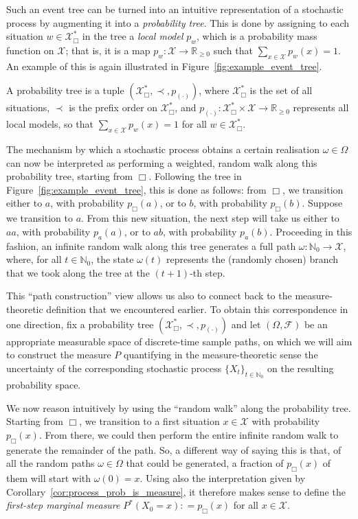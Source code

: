 \documentclass[graybox]{svmult}
\newcommand{\nats}{\mathbb{N}}
\newcommand{\natswith}{\nats_{0}}
\newcommand{\reals}{\mathbb{R}}
\newcommand{\realsnonneg}{\reals_{\geq 0}}
\newcommand{\states}{\mathcal{X}}
\newcommand{\coloneqq}{:\!=}
\begin{document}
Such an event tree can be turned into an intuitive representation of a stochastic process by augmenting it into a \emph{probability tree}. This is done by assigning to each situation $w\in\states^*_\Box$ in the tree a \emph{local model} $p_{w}$, which is a probability mass function on $\states$; that is, it is a map $p_w:\states\to\realsnonneg$ such that $\sum_{x\in\states}p_w(x)=1$. An example of this is again illustrated in Figure~\ref{fig:example_event_tree}.
\begin{definition}\label{def:prob_tree}
A probability tree is a tuple $(\states^*_\Box,\prec,p_{(\cdot)})$, where $\states^*_\Box$ is the set of all situations, $\prec$ is the prefix order on $\states^*_\Box$, and $p_{(\cdot)}:\states^*_\Box\times\states\to\realsnonneg$ represents all local models, so that $\sum_{x\in\states}p_w(x)=1$ for all $w\in\states^*_\Box$.
\end{definition}

The mechanism by which a stochastic process obtains a certain realisation $\omega\in\Omega$ can now be interpreted as performing a weighted, random walk along this probability tree, starting from $\Box$. Following the tree in Figure~\ref{fig:example_event_tree}, this is done as follows: from $\Box$, we transition either to $a$, with probability $p_\Box(a)$, or to $b$, with probability $p_\Box(b)$. Suppose we transition to $a$. From this new situation, the next step will take us either to $aa$, with probability $p_a(a)$, or to $ab$, with probability $p_a(b)$. Proceeding in this fashion, an infinite random walk along this tree generates a full path $\omega:\natswith\to\states$, where, for all $t\in\natswith$, the state $\omega(t)$ represents the (randomly chosen) branch that we took along the tree at the $(t+1)$-th step.

This ``path construction'' view allows us also to connect back to the measure-theoretic definition that we encountered earlier. To obtain this correspondence in one direction, fix a probability tree $(\states^*_\Box,\prec, p_{(\cdot)})$ and let $(\Omega,\mathcal{F})$ be an appropriate measurable space of discrete-time sample paths, on which we will aim to construct the measure $P$ quantifying in the measure-theoretic sense the uncertainty of the corresponding stochastic process $\{X_t\}_{t\in\natswith}$ on the resulting probability space.

We now reason intuitively by using the ``random walk'' along the probability tree. Starting from $\Box$, we transition to a first situation $x\in\states$ with probability $p_\Box(x)$. From there, we could then perform the entire infinite random walk to generate the remainder of the path. So, a different way of saying this is that, of all the random paths $\omega\in\Omega$ that could be generated, a fraction of $p_\Box(x)$ of them will start with $\omega(0)=x$. Using also the interpretation given by Corollary~\ref{cor:process_prob_is_measure}, it therefore makes sense to define the \emph{first-step marginal measure} $P^*(X_0=x) \coloneqq p_\Box(x)$ for all $x\in\states$.
\end{document}
